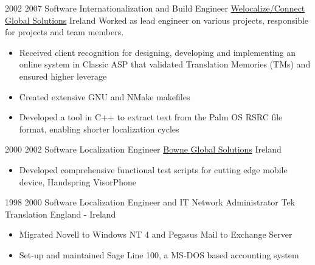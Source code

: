 \documentclass[a4paper]{twentysecondcv} %
\begin{document}
\begin{twenty}
\twentyitem
    	{2002} %
	{2007} %
    {Software Internationalization and Build Engineer} %
    {\href{https://www.welocalize.com/}{Welocalize/Connect Global Solutions}} %
    {Ireland} %
    {Worked as lead engineer on various projects, responsible for projects and team members.} %
	{}
	{\begin{itemize}
		\item Received client recognition for designing, developing and implementing an online system in Classic ASP that validated Translation Memories (TMs) and ensured higher leverage
		\item Created extensive GNU and NMake makefiles
		\item Developed a tool in C++ to extract text from the Palm OS RSRC file format, enabling shorter localization cycles
	 \end{itemize}
	}
\end{twenty}

\vspace{0.75\baselineskip}%

\begin{twenty}
\twentyitem
	{2000}
	{2002}
    {Software Localization Engineer}
    {\href{https://www.lionbridge.com/}{Bowne Global Solutions}}
    {Ireland}
    {}
    {}
    {\begin{itemize}
		\item Developed comprehensive functional test scripts for cutting edge mobile device, Handspring VisorPhone
	 \end{itemize}
    }
\end{twenty}

\vspace{0.75\baselineskip}%

\begin{twenty}
\twentyitem
	{1998}
	{2000}
    {Software Localization Engineer and IT Network Administrator}
    {Tek Translation}
    {England - Ireland}
    {}
    {}
    {\begin{itemize}
		\item Migrated Novell to Windows NT 4 and Pegasus Mail to Exchange Server
		\item Set-up and maintained Sage Line 100, a MS-DOS based accounting system
	 \end{itemize}
    }
\end{twenty}
\end{document}
